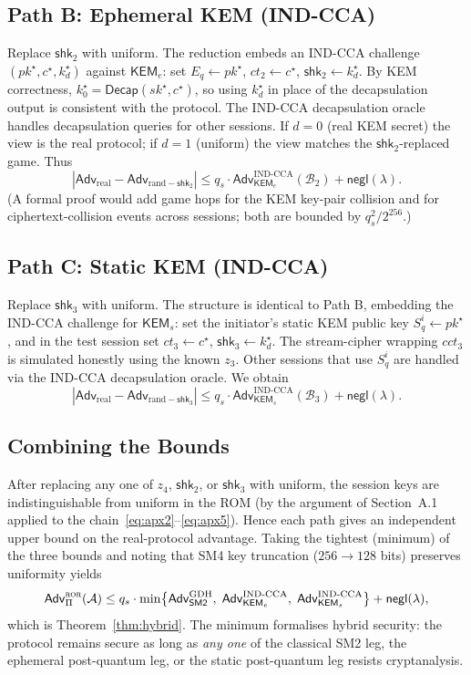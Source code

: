 \documentclass{SCIS2026}
\newcommand{\negl}{\mathsf{negl}}
\newcommand{\Adv}{\mathsf{Adv}}
\newcommand{\KEMs}{\textsf{KEM}_s}
\newcommand{\KEMe}{\textsf{KEM}_e}
\newcommand{\Decap}{\mathsf{Decap}}
\begin{document}
\begin{appendix}
\subsection{Path B: Ephemeral KEM (IND-CCA)}

Replace $\textsf{shk}_2$ with uniform.  The reduction embeds an
IND-CCA challenge $(\mathit{pk}^\star, c^\star, k^\star_d)$ against
$\KEMe$: set $E_q \gets \mathit{pk}^\star$, $\textit{ct}_2 \gets
c^\star$, $\textsf{shk}_2 \gets k^\star_d$.  By KEM correctness,
$k^\star_0 = \Decap(\mathit{sk}^\star, c^\star)$, so using $k^\star_d$
in place of the decapsulation output is consistent with the protocol.
The IND-CCA decapsulation oracle handles decapsulation queries for
other sessions.  If $d=0$ (real KEM secret) the view is the real
protocol; if $d=1$ (uniform) the view matches the $\textsf{shk}_2$-replaced
game.  Thus
\[
|\Adv_{\text{real}} - \Adv_{\text{rand}-\textsf{shk}_2}| \le
q_s \!\cdot\! \Adv^{\mathrm{IND\text{-}CCA}}_{\KEMe}(\mathcal{B}_2)
+ \negl(\lambda).
\]
(A formal proof would add game hops for the KEM key-pair collision and
for ciphertext-collision events across sessions; both are bounded by
$q_s^2/2^{256}$.)

\subsection{Path C: Static KEM (IND-CCA)}

Replace $\textsf{shk}_3$ with uniform.  The structure is identical to
Path B, embedding the IND-CCA challenge for $\KEMs$: set the initiator's
static KEM public key $S^i_q \gets \mathit{pk}^\star$, and in the test
session set $\textit{ct}_3 \gets c^\star$, $\textsf{shk}_3 \gets
k^\star_d$.  The stream-cipher wrapping $\textit{cct}_3$ is simulated
honestly using the known $z_3$.  Other sessions that use $S^i_q$ are
handled via the IND-CCA decapsulation oracle.  We obtain
\[
|\Adv_{\text{real}} - \Adv_{\text{rand}-\textsf{shk}_3}| \le
q_s \!\cdot\! \Adv^{\mathrm{IND\text{-}CCA}}_{\KEMs}(\mathcal{B}_3)
+ \negl(\lambda).
\]

\subsection{Combining the Bounds}

After replacing any one of $z_4$, $\textsf{shk}_2$, or $\textsf{shk}_3$
with uniform, the session keys are indistinguishable from uniform in
the ROM (by the argument of Section~A.1 applied to
the chain~\eqref{eq:apx2}--\eqref{eq:apx5}).  Hence each path gives an
independent upper bound on the real-protocol advantage.  Taking the
tightest (minimum) of the three bounds and noting that SM4 key
truncation ($256 \to 128$ bits) preserves uniformity yields
\[
\Adv^{\textsc{ror}}_{\Pi}(\mathcal A) \le
q_s\cdot\min\bigl\{
\Adv^{\mathrm{GDH}}_{\textsf{SM2}},\;
\Adv^{\mathrm{IND\text{-}CCA}}_{\KEMe},\;
\Adv^{\mathrm{IND\text{-}CCA}}_{\KEMs}
\bigr\} + \negl(\lambda),
\]
which is Theorem~\ref{thm:hybrid}.  The minimum formalises hybrid
security: the protocol remains secure as long as \emph{any one} of the
classical SM2 leg, the ephemeral post-quantum leg, or the static
post-quantum leg resists cryptanalysis.


\end{appendix}
\end{document}

